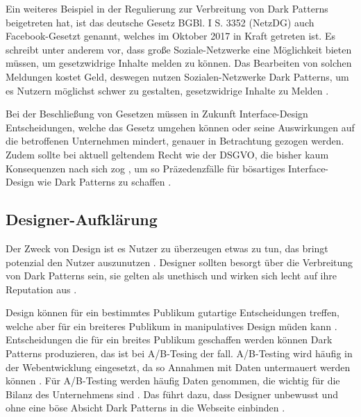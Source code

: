 \documentclass[conference,compsoc,final,a4paper]{IEEEtran}
\begin{document}
Ein weiteres Beispiel in der Regulierung zur Verbreitung von Dark Patterns beigetreten hat, ist das deutsche Gesetz BGBl. I S. 3352 (\ac{NetzDG}) auch Facebook-Gesetzt genannt, welches im Oktober 2017 in Kraft getreten ist. Es schreibt unter anderem vor, dass große Soziale-Netzwerke eine Möglichkeit bieten müssen, um gesetzwidrige Inhalte melden zu können. Das Bearbeiten von solchen Meldungen kostet Geld, deswegen nutzen Sozialen-Netzwerke Dark Patterns, um es Nutzern möglichst schwer zu gestalten, gesetzwidrige Inhalte zu Melden \autocite{Rieger2020}.


Bei der Beschließung von Gesetzen müssen in Zukunft Interface-Design Entscheidungen, welche das Gesetz umgehen können oder seine Auswirkungen auf die betroffenen Unternehmen mindert, genauer in Betrachtung gezogen werden. Zudem sollte bei aktuell geltendem Recht wie der \ac{DSGVO}, die bisher kaum Konsequenzen nach sich zog \autocite{Nouwens2020}, um so Präzedenzfälle für bösartiges Interface-Design wie Dark Patterns zu schaffen \autocite{Rieger2020}.

\subsection{Designer-Aufklärung}
Der Zweck von Design ist es Nutzer zu überzeugen etwas zu tun, das bringt potenzial den Nutzer auszunutzen \autocites{OinasKukkonen2009}{Sengers2005}. Designer sollten besorgt über die Verbreitung von Dark Patterns sein, sie gelten als unethisch und wirken sich lecht auf ihre Reputation aus \autocite{Narayanan2020}.

Design können für ein bestimmtes Publikum gutartige Entscheidungen treffen, welche aber für ein breiteres Publikum in manipulatives Design müden kann \autocite{Gray_2018}. Entscheidungen die für ein breites Publikum geschaffen werden können Dark Patterns produzieren, das ist bei A/B-Tesing der fall. A/B-Testing wird häufig in der Webentwicklung eingesetzt, da so Annahmen mit Daten untermauert werden können \autocite{Kohavi2017}. Für A/B-Testing werden häufig Daten genommen, die wichtig für die Bilanz des Unternehmens sind \autocites{Kohavi2017}{Narayanan2020}. Das führt dazu, dass Designer unbewusst und ohne eine böse Absicht Dark Patterns in die Webseite einbinden \autocite{Narayanan2020}.
\end{document}
